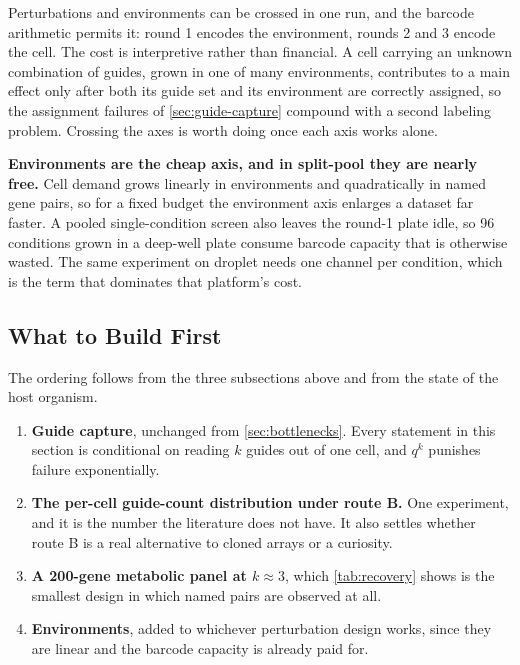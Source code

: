  Perturbations and environments can be crossed in one
run, and the barcode arithmetic permits it: round 1 encodes the environment,
rounds 2 and 3 encode the cell. The cost is interpretive rather than financial.
A cell carrying an unknown combination of guides, grown in one of many
environments, contributes to a main effect only after both its guide set and its
environment are correctly assigned, so the assignment failures of
\cref{sec:guide-capture} compound with a second labeling problem. Crossing the
axes is worth doing once each axis works alone.

\begin{keybox}
\textbf{Environments are the cheap axis, and in split-pool they are nearly
free.} Cell demand grows linearly in environments and quadratically in named
gene pairs, so for a fixed budget the environment axis enlarges a dataset far
faster. A pooled single-condition screen also leaves the round-1 plate idle, so
96 conditions grown in a deep-well plate consume barcode capacity that is
otherwise wasted. The same experiment on droplet needs one channel per
condition, which is the term that dominates that platform's cost.
\end{keybox}

\subsection{What to Build First}
\label{sec:scaling-order}

The ordering follows from the three subsections above and from the state of the
host organism.

\begin{enumerate}
\item \textbf{Guide capture}, unchanged from \cref{sec:bottlenecks}. Every
  statement in this section is conditional on reading $k$ guides out of one cell,
  and $q^{k}$ punishes failure exponentially.
\item \textbf{The per-cell guide-count distribution under route B.} One
  experiment, and it is the number the literature does not have. It also settles
  whether route B is a real alternative to cloned arrays or a curiosity.
\item \textbf{A 200-gene metabolic panel at $k\approx3$}, which
  \cref{tab:recovery} shows is the smallest design in which named pairs are
  observed at all.
\item \textbf{Environments}, added to whichever perturbation design works, since
  they are linear and the barcode capacity is already paid for.
\end{enumerate}
